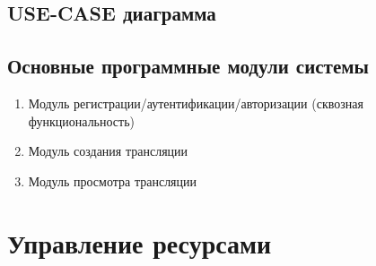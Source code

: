 \documentclass[a4paper]{report}
\begin{document}
\subsection*{USE-CASE диаграмма}
\begin{figure}[h]
  \centering
  \caption{}
  \label{third}
\end{figure}

\subsection*{Основные программные модули системы}
\begin{enumerate}
\item Модуль регистрации/аутентификации/авторизации (сквозная функциональность)
\item Модуль создания трансляции
\item Модуль просмотра трансляции
\end{enumerate}
\begin{figure}[h!]
  \centering
  \label{third}
\end{figure}

\section*{Управление ресурсами}
\end{document}
